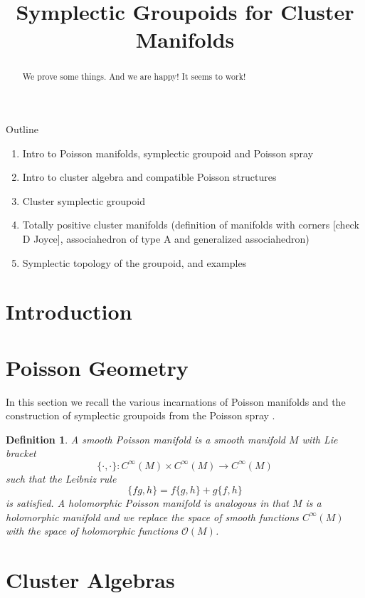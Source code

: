 \documentclass{amsart}
\title{Symplectic Groupoids for Cluster Manifolds}
\newtheorem{definition}[theorem]{Definition}
\begin{document}
\begin{abstract}
  We prove some things.
  And we are happy!
  It seems to work!
\end{abstract}
\maketitle
Outline
\begin{enumerate}
	\item Intro to Poisson manifolds, symplectic groupoid and Poisson spray
	\item Intro to cluster algebra and compatible Poisson structures 
	\item Cluster symplectic groupoid
	\item Totally positive cluster manifolds (definition of manifolds with corners [check D Joyce], associahedron of type A and generalized associahedron)
	\item Symplectic topology of the groupoid, and examples
\end{enumerate}

\section{Introduction}


\section{Poisson Geometry}
In this section we recall the various incarnations of Poisson manifolds and the construction of symplectic groupoids from the Poisson spray \cite{MR2900786}.

\begin{definition}
A smooth Poisson manifold is a smooth manifold $M$ with Lie bracket
$$
	\{\cdot, \cdot\}: C^\infty(M) \times C^\infty(M) \to C^\infty(M)
$$
such that the Leibniz rule
$$
	\{fg, h\} = f\{g,h\} + g\{f,h\}
$$
is satisfied. A holomorphic Poisson manifold is analogous in that $M$ is a holomorphic manifold and we replace the space of smooth functions $C^\infty(M)$ with the space of holomorphic functions $\mathcal{O}(M)$.
\end{definition}


\section{Cluster Algebras}


\end{document}
